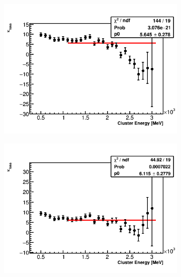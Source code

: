 \begin{landscape}
\begin{figure}[h]
\centering
    \begin{subfigure}[t]{0.4\textwidth}
        \centering
        \includegraphics[width=\textwidth]{TMethod_kappa_loss_Vs_EBin_Canv_HK-0}
        \caption{}
    \end{subfigure}%
    \hspace{1cm}
    \begin{subfigure}[t]{0.4\textwidth}
        \centering
        \includegraphics[width=\textwidth]{TMethod_kappa_loss_Vs_EBin_Canv_HK-5p1}
        \caption{}
    \end{subfigure}

\end{figure}
\end{landscape}
